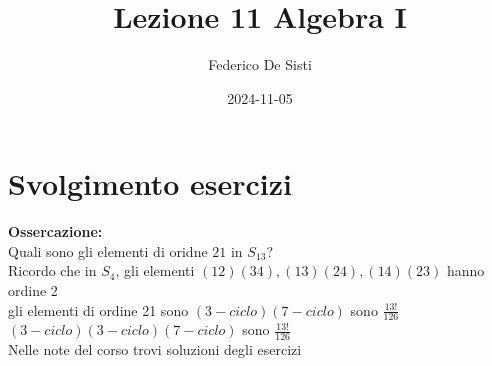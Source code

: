 \documentclass[12px]{article}
\title{Lezione 11 Algebra I}
\date{2024-11-05}
\author{Federico De Sisti}
\begin{document}
	\maketitle
	\newpage
	\section{Svolgimento esercizi}
	\textbf{Ossercazione:}\\
	Quali sono gli elementi di oridne $21$ in $S_{13}$?\\
	Ricordo che in $S_4$, gli elementi $(12)(34), (13)(24), (14)(23)$ hanno ordine 2\\
	gli elementi di ordine 21 sono $(3-ciclo)(7-ciclo)$ sono $\frac {13!}{126}$\\
	$(3-ciclo)(3-ciclo)(7-ciclo)$ sono  $\frac{13!}{126}$ \\
	Nelle note del corso trovi soluzioni degli esercizi\\
\end{document}
